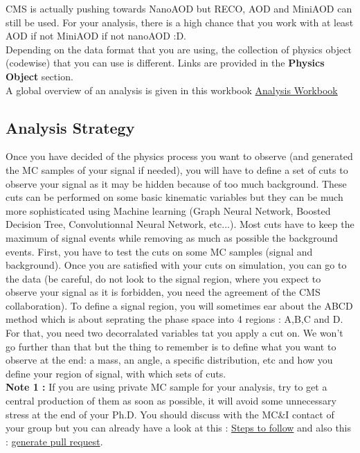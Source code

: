 \documentclass[reprint, a4paper, nofootinbib, amsmath, amssymb, aps]{revtex4-1}
\begin{document}
    CMS is actually pushing towards NanoAOD but RECO, AOD and MiniAOD can still be used. For your analysis, there is a high chance that you work with at least AOD if not MiniAOD if not nanoAOD :D. \\
    Depending on the data format that you are using, the collection of physics object (codewise) that you can use is different. Links are provided in the \textbf{Physics Object} section.\\

    A global overview of an analysis is given in this workbook \href{https://twiki.cern.ch/twiki/bin/view/CMSPublic/WorkBook}{Analysis Workbook}\\
        
    
\subsection{Analysis Strategy}
    Once you have decided of the physics process you want to observe (and generated the MC samples of your signal if needed), you will have to define a set of cuts to observe your signal as it may be hidden because of too much background. These cuts can be performed on some basic kinematic variables but they can be much more sophisticated using Machine learning (Graph Neural Network, Boosted Decision Tree, Convolutionnal Neural Network, etc...). Most cuts have to keep the maximum of signal events while removing as much as possible the background events. First, you have to test the cuts on some MC samples (signal and background). Once you are satisfied with your cuts on simulation, you can go to the data (be careful, do not look to the signal region, where you expect to observe your signal as it is forbidden, you need the agreement of the CMS collaboration). To define a signal region, you will sometimes ear about the ABCD method which is about seprating the phase space into 4 regions : A,B,C and D. For that, you need two decorralated variables tat you apply a cut on.
    We won't go further than that but the thing to remember is to define what you want to observe at the end: a mass, an angle, a specific distribution, etc and how you define your region of signal, with which sets of cuts.\\
    \textbf{Note 1 :} If you are using private MC sample for your analysis, try to get a central production of them as soon as possible, it will avoid some unnecessary stress at the end of  your Ph.D. You should discuss with the MC\&I contact of your group but you can already have a look at this : \href{https://cms-pdmv.gitbook.io/project/mccontact#preliminary-steps}{Steps to follow} and also this : \href{https://twiki.cern.ch/twiki/bin/viewauth/CMS/GitRepositoryForGenProduction}{generate pull request}.
    
\end{document}
